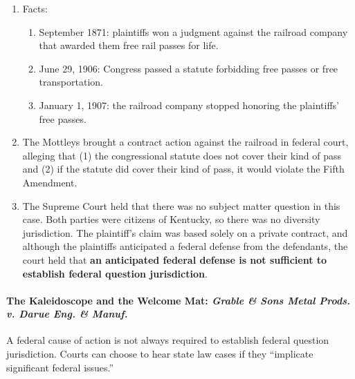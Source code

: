\begin{enumerate}
    \item Facts:
    \begin{enumerate}
        \item September 1871: plaintiffs won a judgment against the railroad 
        company that awarded them free rail passes for life.
        \item June 29, 1906: Congress passed a statute forbidding free passes 
        or free transportation.
        \item January 1, 1907: the railroad company stopped honoring the 
        plaintiffs' free passes.
    \end{enumerate}
    \item The Mottleys brought a contract action against the railroad in 
    federal court, alleging that (1) the congressional statute does not cover 
    their kind of pass and (2) if the statute did cover their kind of pass, it 
    would violate the Fifth Amendment.
    \item The Supreme Court held that there was no subject matter question in 
    this case. Both parties were citizens of Kentucky, so there was no 
    diversity jurisdiction. The plaintiff's claim was based solely on a 
    private contract, and although the plaintiffs anticipated a federal 
    defense from the defendants, the court held that \textbf{an anticipated 
    federal defense is not sufficient to establish federal question 
    jurisdiction}.
\end{enumerate}

\paragraph{The Kaleidoscope and the Welcome Mat: \emph{Grable \& Sons Metal 
Prods. v. Darue Eng. \& Manuf.}}

A federal cause of action is not always required to establish federal question 
jurisdiction. Courts can choose to hear state law cases if they ``implicate 
significant federal issues.''


